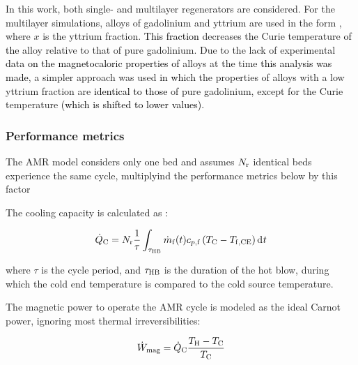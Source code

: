 \documentclass[draft]{svjour3}
\newcommand{\mrate}{\rate{m}}
\begin{document}
In this work, both single- and multilayer regenerators are considered. For the multilayer simulations, alloys of gadolinium and yttrium are used in the form , where $x$ is the yttrium fraction.  \textcolor{black}{This fraction} decreases the Curie temperature  \textcolor{black}{of the} alloy relative to that of pure gadolinium. Due to the lack of experimental  \textcolor{black}{data on the magnetocaloric properties of}  alloys at the time \textcolor{black}{this analysis was made}, a simpler approach was used \textcolor{black}{in which} the properties of alloys with {a} low yttrium fraction are \textcolor{black}{identical to those} of pure gadolinium, except for the Curie temperature \textcolor{black}{(which is shifted to lower values)}. 


\subsubsection{Performance metrics}
\label{sec:performance-metrics}

The AMR model considers only one bed and assumes $N_{\mathrm{r}}$ identical beds experience the same cycle, multiplyind the performance metrics below by this factor


The cooling capacity is calculated as \cite{bib:trevizoli16_perfor_model}:

\begin{equation}
\label{eq:99}
\qc = N\ped{r}\frac{1}{\tau} \int_{\tau\ped{HB}} \mrate\ped{f}(t) c_{p,\mathrm{f}} \left( T\ped{C} -T\ped{f,CE} \right) \diffd{t}
\end{equation}

\noindent where $\tau$ is the cycle period, and $\tau_{\mathrm{HB}}$ is the duration of the hot blow, during which the cold end temperature is compared to the cold source temperature.

\nomenclature[am]{$\mrate\ped{f}$}{mass flow rate [\si{\kg\per\second}]}

The magnetic power to operate the AMR cycle is modeled as the ideal Carnot power, ignoring most thermal irreversibilities:

\begin{equation}
\label{eq:100}
\dot{W}_{\mathrm{mag}} = \dot{Q}_{\mathrm{C}} \frac{T_{\mathrm{H}} - T_{\mathrm{C}}}{T_{\mathrm{C}}}
\end{equation}
\end{document}
